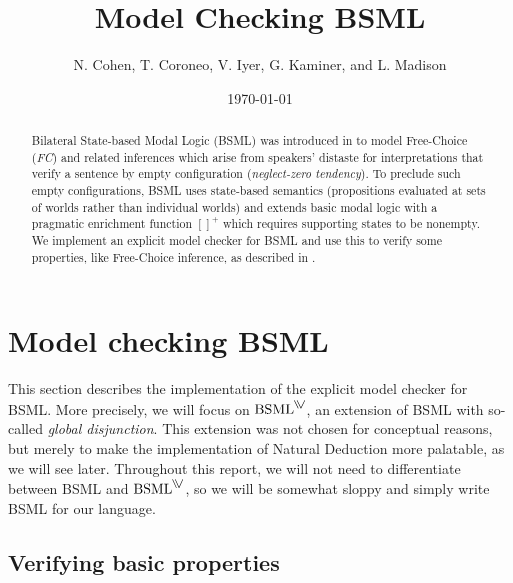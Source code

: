 \documentclass[11pt,a4paper]{article}
\title{Model Checking BSML}
\author{N. Cohen, T. Coroneo, V. Iyer, G. Kaminer, and L. Madison}
\date{\today}
\begin{document}
\maketitle

\begin{abstract}
Bilateral State-based Modal Logic (BSML) was introduced in \cite{Aloni2022} to model Free-Choice (\textit{FC}) and related inferences which arise from speakers' distaste for
interpretations that verify a sentence by empty configuration (\textit{neglect-zero tendency}). To preclude such empty configurations, BSML uses state-based semantics (propositions evaluated at sets of worlds rather than individual worlds) and extends basic modal logic with a pragmatic enrichment function $[]^+$ which requires supporting states to be nonempty.
We implement an explicit model checker for BSML and use this to verify some properties, like Free-Choice inference, as described in \cite{Aloni2024}.
\end{abstract}

\tableofcontents

\clearpage



\section{Model checking BSML}\label{sec:BSML}

This section describes the implementation of the explicit model checker for BSML. 
More precisely, we will focus on $\mathrm{BSML}^{\gor}$, an extension of BSML with so-called \emph{global disjunction}. 
This extension was not chosen for conceptual reasons, but merely to make the implementation of Natural Deduction more palatable, as we will see later. 
Throughout this report, we will not need to differentiate between BSML and $\mathrm{BSML}^{\gor}$, so we will be somewhat sloppy and simply write BSML for our language. 







\subsection{Verifying basic properties}
\end{document}
